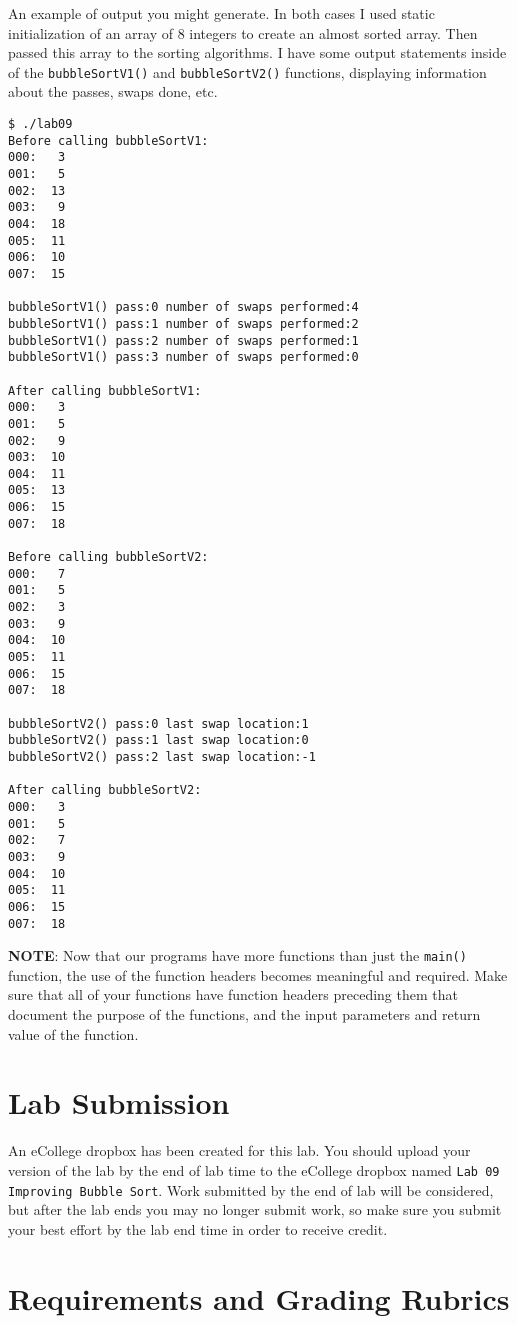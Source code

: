 \documentclass[11pt]{article}
\begin{document}
An example of output you might generate.  In both cases I used static
initialization of an array of 8 integers to create an almost sorted
array.  Then passed this array to the sorting algorithms.  I have some
output statements inside of the \verb~bubbleSortV1()~ and \verb~bubbleSortV2()~
functions, displaying information about the passes, swaps done, etc.

\begin{verbatim}
$ ./lab09
Before calling bubbleSortV1:
000:   3
001:   5
002:  13
003:   9
004:  18
005:  11
006:  10
007:  15

bubbleSortV1() pass:0 number of swaps performed:4
bubbleSortV1() pass:1 number of swaps performed:2
bubbleSortV1() pass:2 number of swaps performed:1
bubbleSortV1() pass:3 number of swaps performed:0

After calling bubbleSortV1:
000:   3
001:   5
002:   9
003:  10
004:  11
005:  13
006:  15
007:  18

Before calling bubbleSortV2:
000:   7
001:   5
002:   3
003:   9
004:  10
005:  11
006:  15
007:  18

bubbleSortV2() pass:0 last swap location:1
bubbleSortV2() pass:1 last swap location:0
bubbleSortV2() pass:2 last swap location:-1

After calling bubbleSortV2:
000:   3
001:   5
002:   7
003:   9
004:  10
005:  11
006:  15
007:  18
\end{verbatim}


\textbf{NOTE}: Now that our programs have more functions than just the
\verb~main()~ function, the use of the function headers becomes meaningful
and required.  Make sure that all of your functions have function
headers preceding them that document the purpose of the functions, and
the input parameters and return value of the function.
\section*{Lab Submission}
\label{sec-4}


An eCollege dropbox has been created for this lab.  You should upload
your version of the lab by the end of lab time to the eCollege dropbox
named \verb~Lab 09 Improving Bubble Sort~.  Work submitted by the end of
lab will be considered, but after the lab ends you may no longer
submit work, so make sure you submit your best effort by the lab end
time in order to receive credit.
\section*{Requirements and Grading Rubrics}
\label{sec-5}
\end{document}

